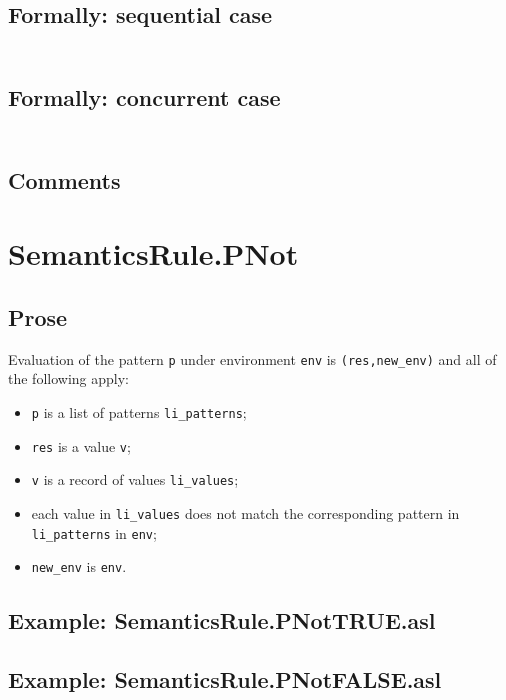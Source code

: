 \documentclass{book}
\begin{document}
  \subsection{Formally: sequential case}
  \begin{align}
  \end{align} 

  \subsection{Formally: concurrent case}
  \begin{align}
  \end{align} 

    \subsection{Comments}

\section{SemanticsRule.PNot \label{sec:SemanticsRule.PNot}}

    \subsection{Prose}
   Evaluation of the pattern \texttt{p} under environment \texttt{env} is
  \texttt{(res,new\_env)} and all of the following apply:
    \begin{itemize}
    \item \texttt{p} is a list of patterns \texttt{li\_patterns};
    \item \texttt{res} is a value \texttt{v};
    \item \texttt{v} is a record of values \texttt{li\_values};
    \item each value in \texttt{li\_values} does not match the corresponding pattern in \texttt{li\_patterns} in \texttt{env};
    \item \texttt{new\_env} is \texttt{env}.
    \end{itemize}
 
    \subsection{Example: SemanticsRule.PNotTRUE.asl}

    \subsection{Example: SemanticsRule.PNotFALSE.asl}
\end{document}
